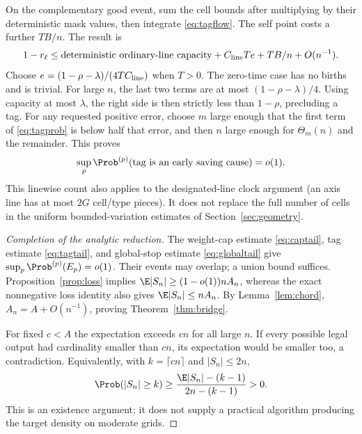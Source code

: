 On the complementary good event, sum the cell bounds after multiplying
by their deterministic mask values, then integrate \eqref{eq:tagflow}.
The self point costs a further \(TB/n\). The result is
\begin{equation}\label{eq:tagcapacity}
 1-r_\ell\le\text{deterministic ordinary-line capacity}
       +C_{\rm line}Te+TB/n+O(n^{-1}).
\end{equation}
Choose \(e=(1-\rho-\lambda)/(4TC_{\rm line})\) when \(T>0\).
The zero-time case has no births and is trivial. For large \(n\),
the last two terms are at most \((1-\rho-\lambda)/4\).
Using capacity at most \(\lambda\), the right side is then strictly
less than \(1-\rho\), precluding a tag. For any requested positive
error, choose \(m\) large enough that the first term of
\eqref{eq:tagprob} is below half that error, and then \(n\) large
enough for \(\Theta_m(n)\) and the remainder. This proves
\begin{equation}\label{eq:tagtail}
 \sup_p\Prob^{(p)}(\text{tag is an early saving cause})=o(1).
\end{equation}
This linewise count also applies to the designated-line clock
argument (an axis line has at most \(2G\) cell/type pieces).
It does not replace the full number of cells in the uniform
bounded-variation estimates of Section~\ref{sec:geometry}.

\begin{proof}[Completion of the analytic reduction]
The weight-cap estimate \eqref{eq:captail}, tag estimate
\eqref{eq:tagtail}, and global-stop estimate \eqref{eq:globaltail}
give \(\sup_p\Prob^{(p)}(E_p)=o(1)\). Their events may overlap;
a union bound suffices. Proposition~\ref{prop:loss} implies
\(\E|S_n|\ge(1-o(1))nA_n\), whereas the exact nonnegative loss
identity also gives \(\E|S_n|\le nA_n\). By Lemma~\ref{lem:chord},
\(A_n=A+O(n^{-1})\), proving Theorem~\ref{thm:bridge}.

For fixed \(c<A\) the expectation exceeds \(cn\) for all large
\(n\). If every possible legal output had cardinality smaller than
\(cn\), its expectation would be smaller too, a contradiction.
Equivalently, with \(k=\lceil cn\rceil\) and \(|S_n|\le2n\),
\[
 \Prob(|S_n|\ge k)\ge
 \frac{\E|S_n|-(k-1)}{2n-(k-1)}>0.
\]
This is an existence argument; it does not supply a practical
algorithm producing the target density on moderate grids.
\end{proof}

